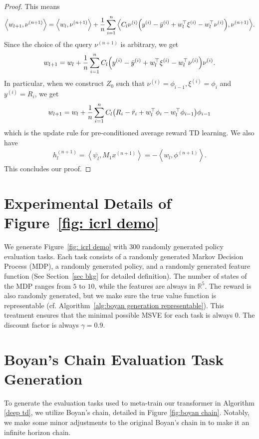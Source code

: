 \documentclass{article}
\newcommand{\R}{\mathbb{R}}
\newcommand{\indot}[2]{{\left<#1, #2\right>}}
\begin{document}
\begin{proof}
    This means
    \begin{align}
        \indot{w_{l+1}}{\nu^{(n+1)}} 
        = \indot{w_l}{\nu^{(n+1)}}
        + \frac{1}{n} \sum_{i=1}^n 
        \indot{C_l \nu^{(i)} \qty(y^{(i)} - \bar{y}^{(i)} + w_l^\top \xi^{(i)} - w_l^\top \nu^{(i)})}{
        \nu^{(n+1)}}.
    \end{align}
    Since the choice of the query $\nu^{(n+1)}$ is arbitrary, we get
     \begin{align}
        w_{l+1} = w_l + \frac{1}{n}\sum_{i=1}^n C_l \qty(y^{(i)} - \bar{y}^{(i)} + w_l^\top \xi^{(i)} - w_l^\top \nu^{(i)}) \nu^{(i)}.
    \end{align}
    In particular, when we construct $Z_0$ such that $\nu^{(i)} = \phi_{i-1}, \xi^{(i)} = \phi_i$ and $y^{(i)} = R_i$, we get
    \begin{align}
        w_{l+1} = w_l + \frac{1}{n}\sum_{i=1}^n C_l \qty(R_i - \bar{r}_i + w_l^\top \phi_i - w_l^\top \phi_{i-1}) \phi_{i-1}
    \end{align}
    which is the update rule for pre-conditioned average reward TD learning.
    We also have
    \begin{align}
        h_l^{(n+1)}
        = \indot{\psi_l}{M_1 x^{(n+1)}} 
        = -\indot{w_l}{\phi^{(n+1)}}.
    \end{align}
    This concludes our proof.
  \end{proof}
\section{Experimental Details of Figure~\ref{fig: icrl demo}}
\label{appendix: demo}
We generate Figure~\ref{fig: icrl demo} with 300 randomly generated policy evaluation tasks.
Each task consists of a randomly generated Markov Decision Process (MDP),
a randomly generated policy, and a randomly generated feature function (See Section~\ref{sec bkg} for detailed definition).
The number of states of the MDP ranges from $5$ to $10$,
while the features are always in $\R^5$.
The reward is also randomly generated, but we make sure the true value function is representable (cf. Algorithm~\ref{alg:boyan generation representable}).
This treatment ensures that the minimal possible MSVE for each task is always 0.
The discount factor is always $\gamma = 0.9$.

\section{Boyan's Chain Evaluation Task Generation} \label{appendix: Markovian Trajectory}
To generate the evaluation tasks used to meta-train our transformer in Algorithm \ref{deep td}, we utilize Boyan's chain, detailed in Figure \ref{fig:boyan chain}. 
Notably,
we make some minor adjustments to the original Boyan's chain in \citet{boyan1999least} to make it an infinite horizon chain.
\end{document}
